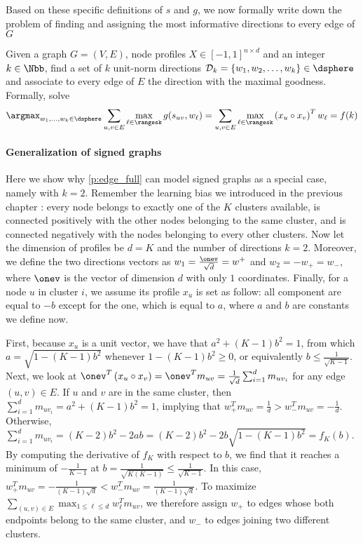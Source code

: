 Based on these specific definitions of $s$ and $g$, we now formally write down the problem of
finding and assigning the most informative directions to every edge of $G$
\begin{problem}[]
  \label{p:edge_full}
  Given a graph $G=(V, E)$, node profiles $X\in [-1, 1]^{n\times d}$ and an integer $k \in \Nbb$,
  find a set of $k$ unit-norm directions $\mathcal{D}_k = \{w_1, w_2, \ldots, w_k\} \in \dsphere$
  and associate to every edge of $E$ the direction with the maximal goodness. Formally, solve
  \begin{equation}
    \label{eq:edge_full}
    \argmax_{w_1,\ldots,w_k \in \dsphere}
    \sum_{u,v \in E} \max_{\ell \in \rangesk} g(s_{uv}, w_{\ell}) =
    \sum_{u,v \in E} \max_{\ell \in \rangesk} \left(x_u \circ x_v\right)^T w_{\ell} = f(k)
  \end{equation}
\end{problem}


\paragraph{Generalization of signed graphs}
\label{par:generalization_of_signed_graphs}

Here we show why \autoref{p:edge_full} can model signed graphs as a special case, namely with $k=2$.
Remember the learning
bias we introduced in the previous chapter : every node belongs to
exactly one of the $K$ clusters available, is connected positively with the other nodes belonging to
the same cluster, and is connected negatively with the nodes belonging to every other clusters. Now
let the dimension of profiles be $d=K$ and the number of directions $k=2$. Moreover, we define the
two directions vectors as $w_1 = \frac{\onev}{\sqrt{d}} = w^+$ and $w_2 = -w_+ = w_-$, where
$\onev$ is the vector of dimension $d$ with only $1$ coordinates. Finally, for a node $u$ in
cluster $i$, we assume its profile $x_u$ is set as follow: all component are equal to $-b$ except
for the \ith{} one, which is equal to $a$, where $a$ and $b$ are constants we define now.

First, because $x_u$ is a unit vector, we have that $a^2 + (K-1)b^2=1$, from which $a =
\sqrt{1-(K-1)b^2}$ whenever $1-(K-1)b^2 \geq 0$, or equivalently $b \leq \frac{1}{\sqrt{K-1}}$.
Next, we look at $\onev^T\left(x_u \circ x_v\right) = \onev^T m_{uv} = \frac{1}{\sqrt{d}}
\sum_{i=1}^d m_{{uv}_i}$ for any edge $(u,v) \in E$. If $u$ and $v$ are in the same cluster, then
$\sum_{i=1}^d m_{{uv}_i} = a^2 + (K-1)b^2 = 1$, implying that $w_+^T m_{uv} = \frac{1}{d} > w_-^T
m_{uv} = -\frac{1}{d}$. Otherwise, $\sum_{i=1}^d m_{{uv}_i} = (K-2)b^2 - 2ab = (K-2)b^2 -
2b\sqrt{1-(K-1)b^2} = f_K(b)$. By computing the derivative of $f_K$ with respect to $b$, we find
that it reaches a minimum of $-\frac{1}{K-1}$ at $b = \frac{1}{\sqrt{K(K-1)}} \leq
\frac{1}{\sqrt{K-1}}$. In this case, $w_+^T m_{uv} = -\frac{1}{(K-1) \sqrt{d}} < w_-^T m_{uv} =
\frac{1}{(K-1) \sqrt{d}}$. To maximize $\sum_{(u,v)\in E} \max_{1 \leq \ell \leq d} w_\ell^T
m_{uv}$, we therefore assign $w_+$ to edges whose both endpoints belong to the same cluster, and
$w_-$ to edges joining two different clusters.

